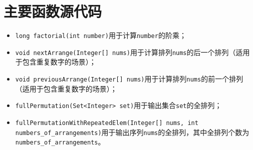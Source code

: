 \documentclass[11pt]{homework}
\begin{document}
\section*{主要函数源代码}

\begin{itemize}
  \item \verb|long factorial(int number)|用于计算\verb|number|的阶乘；
  \item \verb|void nextArrange(Integer[] nums)|用于计算排列\verb|nums|的后一个排列（适用于包含重复数字的场景）；
  \item \verb|void previousArrange(Integer[] nums)|用于计算排列\verb|nums|的前一个排列（适用于包含重复数字的场景）；
  \item \verb|fullPermutation(Set<Integer> set)|用于输出集合\verb|set|的全排列；
  \item \verb|fullPermutationWithRepeatedElem(Integer[] nums, int numbers_of_arrangements)|用于输出序列\verb|nums|的全排列，其中全排列个数为\verb|numbers_of_arrangements|。
\end{itemize}
\end{document}
